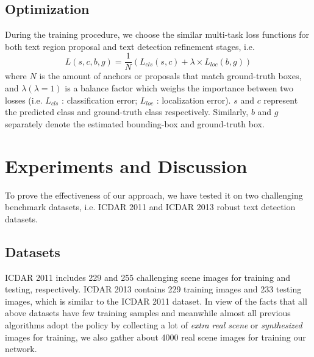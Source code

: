 \documentclass[letterpaper]{article}
\begin{document}
\subsection{Optimization}
During the training procedure, we choose the similar multi-task loss functions for both text region proposal and text detection refinement stages, i.e. 
\begin{equation}\label{loss}
L\left(s,c,b,g\right)=\frac{1}{N}\left(L_{cls}{\left(s,c\right)} + \lambda\times L_{loc}{\left(b,g\right)}\right)
\end{equation}
where $N$ is the amount of anchors or proposals that match ground-truth boxes, and $\lambda \left(\lambda = 1\right)$ is a balance factor which weighs the importance between two losses (i.e. $L_{cls}$ : classification error; $L_{loc}$ : localization error). $s$ and $c$ represent the predicted class and ground-truth class respectively. Similarly, $b$ and $g$ separately denote the estimated bounding-box and ground-truth box.

\section{Experiments and Discussion}
To prove the effectiveness of our approach, we have tested it on two challenging benchmark datasets, i.e. ICDAR 2011 \cite{shahab2011icdar} and ICDAR 2013 \cite{karatzas2013icdar} robust text detection datasets.
\subsection{Datasets}
ICDAR 2011 includes 229 and 255 challenging scene images for training and testing, respectively. ICDAR 2013 contains 229 training images and 233 testing images, which is similar to the ICDAR 2011 dataset. In view of the facts that all above datasets have few training samples and meanwhile almost all previous algorithms adopt the policy by collecting a lot of \textit{extra real scene} or \textit{synthesized} images for training, we also gather about 4000 real scene images for training our network.
\end{document}
